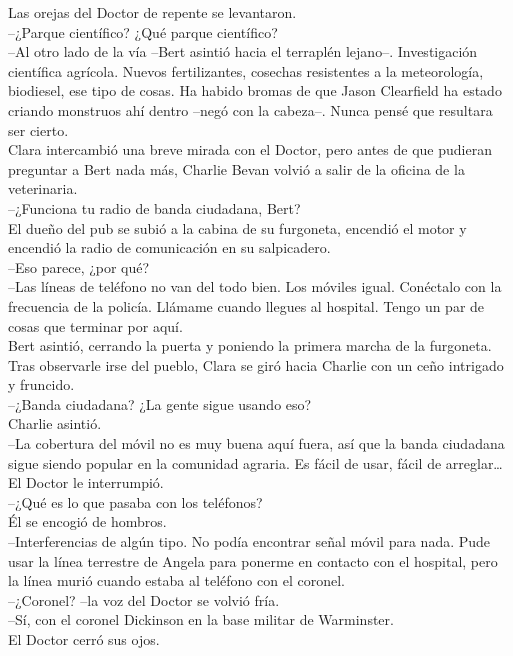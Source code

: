 Las orejas del Doctor de repente se levantaron.\\
--¿Parque científico? ¿Qué parque científico?\\
--Al otro lado de la vía --Bert asintió hacia el terraplén lejano--.
Investigación científica agrícola. Nuevos fertilizantes, cosechas
resistentes a la meteorología, biodiesel, ese tipo de cosas. Ha habido
bromas de que Jason Clearfield ha estado criando monstruos ahí dentro
--negó con la cabeza--. Nunca pensé que resultara ser cierto.\\
Clara intercambió una breve mirada con el Doctor, pero antes de que
pudieran preguntar a Bert nada más, Charlie Bevan volvió a salir de la
oficina de la veterinaria.\\
--¿Funciona tu radio de banda ciudadana, Bert?\\
El dueño del pub se subió a la cabina de su furgoneta, encendió el motor
y encendió la radio de comunicación en su salpicadero.\\
--Eso parece, ¿por qué?\\
--Las líneas de teléfono no van del todo bien. Los móviles igual.
Conéctalo con la frecuencia de la policía. Llámame cuando llegues al
hospital. Tengo un par de cosas que terminar por aquí.\\
Bert asintió, cerrando la puerta y poniendo la primera marcha de la
furgoneta. Tras observarle irse del pueblo, Clara se giró hacia Charlie
con un ceño intrigado y fruncido.\\
--¿Banda ciudadana? ¿La gente sigue usando eso?\\
Charlie asintió.\\
--La cobertura del móvil no es muy buena aquí fuera, así que la banda
ciudadana sigue siendo popular en la comunidad agraria. Es fácil de
usar, fácil de arreglar\ldots{}\\
El Doctor le interrumpió.\\
--¿Qué es lo que pasaba con los teléfonos?\\
Él se encogió de hombros.\\
--Interferencias de algún tipo. No podía encontrar señal móvil para
nada. Pude usar la línea terrestre de Angela para ponerme en contacto
con el hospital, pero la línea murió cuando estaba al teléfono con el
coronel.\\
--¿Coronel? --la voz del Doctor se volvió fría.\\
--Sí, con el coronel Dickinson en la base militar de Warminster.\\
El Doctor cerró sus ojos.\\
